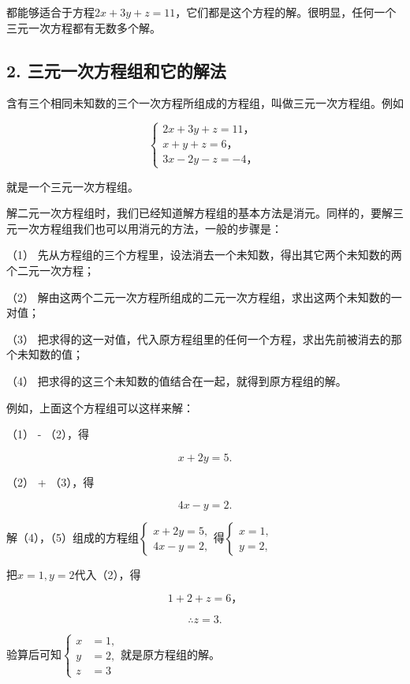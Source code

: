 都能够适合于方程\(2x + 3y + z = 11\)，它们都是这个方程的解。很明显，任何一个三元一次方程都有无数多个解。

\subsection{2. 三元一次方程组和它的解法}

含有三个相同未知数的三个一次方程所组成的方程组，叫做三元一次方程组。例如

\[
\left\{ \begin{array}{l} 2 x + 3 y + z = 11\text{，} \\ x + y + z = 6\text{，} \\ 3 x - 2 y - z = - 4\text{，} \end{array} \right. \tag{1}
\]

就是一个三元一次方程组。

解二元一次方程组时，我们已经知道解方程组的基本方法是消元。同样的，要解三元一次方程组我们也可以用消元的方法，一般的步骤是：

（1）
先从方程组的三个方程里，设法消去一个未知数，得出其它两个未知数的两个二元一次方程；

（2）
解由这两个二元一次方程所组成的二元一次方程组，求出这两个未知数的一对值；

（3）
把求得的这一对值，代入原方程组里的任何一个方程，求出先前被消去的那个未知数的值；

（4） 把求得的这三个未知数的值结合在一起，就得到原方程组的解。

例如，上面这个方程组可以这样来解：

（1） - （2），得

\[
x + 2 y = 5. \tag{4}
\]

（2） + （3），得

\[
4 x - y = 2. \tag{5}
\]

解（4），（5）组成的方程组\(\left\{ \begin{array}{l} x + 2y = 5, \\ 4x - y = 2, \end{array} \right.\)得\(\left\{ \begin{array}{l} x = 1, \\ y = 2, \end{array} \right.\)

把\(x = 1, y = 2\)代入（2），得

\[
1 + 2 + z = 6\text{，}
\]

\[
\therefore z = 3.
\]

验算后可知\(\left\{\begin{aligned}x&=1,\\ y&=2,\\ z&=3\end{aligned}\right.\)就是原方程组的解。

